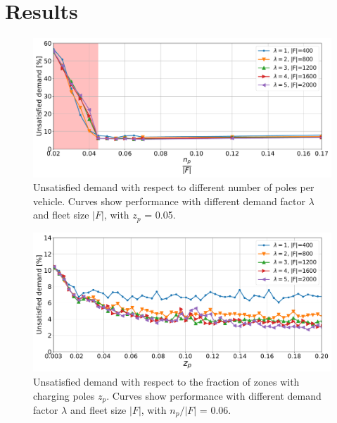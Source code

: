 \section{Results}
\label{sec:10_5_results}





\begin{figure}[t]
\centering
\includegraphics[width=1.\linewidth]{fig/final/unsatisfied_zp-5.pdf}
\caption{Unsatisfied demand with respect to different number of poles per vehicle. Curves show performance with different demand factor $\lambda$ and fleet size $|F|$, with $z_p$ = 0.05.}
\label{fig:10_5_unsatisfied_load1_zp5}
\end{figure}


\begin{figure}[t]
\centering
\includegraphics[width=1.\linewidth]{fig/final/unsatisfied_zp.pdf}
\caption{Unsatisfied demand with respect to the fraction of zones with charging poles  $z_p$. Curves show performance with different demand factor $\lambda$ and fleet size $|F|$, with  $n_p/|F|$ = 0.06.}
\label{fig:10_5_unsatisfied_zp}
\end{figure}

